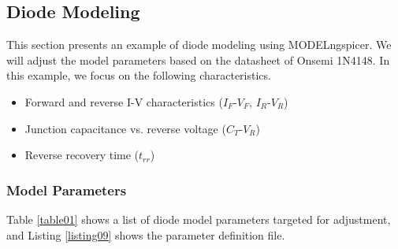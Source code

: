 \documentclass[a4paper,12pt,titlepage]{article}
\begin{document}
\subsection{Diode Modeling}

This section presents an example of diode modeling using MODELngspicer. We will adjust the model parameters based on
the datasheet of Onsemi 1N4148. In this example, we focus on the following characteristics.

\begin{itemize}
    \setlength{\parskip}{0mm}
    \setlength{\itemsep}{0mm}
    \item Forward and reverse I-V characteristics ($I_F$-$V_F$, $I_R$-$V_R$)
    \item Junction capacitance vs. reverse voltage ($C_T$-$V_R$)
    \item Reverse recovery time ($t_{rr}$)
\end{itemize}

\subsubsection{Model Parameters}

Table \ref{table01} shows a list of diode model parameters targeted for adjustment, and Listing \ref{listing09} shows
the parameter definition file.
\end{document}

